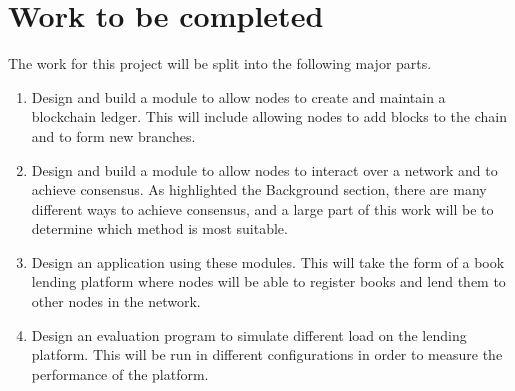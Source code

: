 \documentclass[12pt, letterpaper, twoside]{article}
\begin{document}
	\section*{Work to be completed}
	The work for this project will be split into the following major parts.
	\begin{enumerate} 
		\item Design and build a module to allow nodes to create and maintain a blockchain ledger. This will include allowing nodes to add blocks to the chain and to form new branches.
		\item Design and build a module to allow nodes to interact over a network and to achieve consensus. As highlighted the Background section, there are many different ways to achieve consensus, and a large part of this work will be to determine which method is most suitable.
		\item Design an application using these modules. This will take the form of a book lending platform where nodes will be able to register books and lend them to other nodes in the network.
		\item Design an evaluation program to simulate different load on the lending platform. This will be run in different configurations in order to measure the performance of the platform.
	\end{enumerate}
\end{document}
